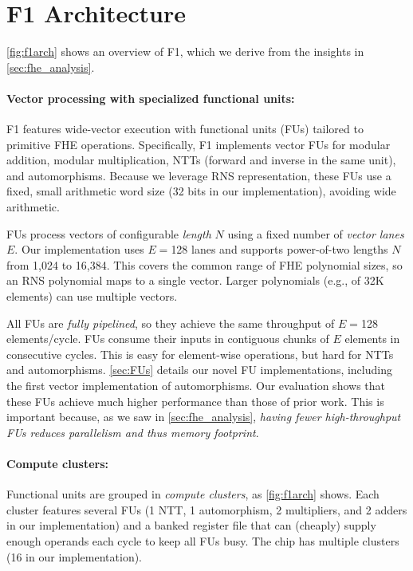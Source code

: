 \section{F1 Architecture}\label{sec:arch}

\autoref{fig:f1arch} shows an overview of F1, which we derive from the insights in \autoref{sec:fhe_analysis}.

\paragraph{Vector processing with specialized functional units:}
F1 features wide-vector execution with functional units (FUs) tailored to 
primitive FHE operations.
Specifically, F1 implements vector FUs for modular addition, modular multiplication, NTTs (forward and inverse in the same unit),
and automorphisms.
Because we leverage RNS representation, these FUs use a fixed, small arithmetic word size (32 bits in our implementation),
avoiding wide arithmetic.

FUs process vectors of configurable \emph{length} $N$ using a fixed number of \emph{vector lanes} $E$.
Our implementation uses $E=$128 lanes and supports power-of-two lengths $N$ from 1,024 to 16,384.
This covers the common range of FHE polynomial sizes, so an RNS polynomial maps to a single vector.
Larger polynomials (e.g., of 32K elements) can use multiple vectors.

All FUs are \emph{fully pipelined}, so they achieve the same throughput of $E=$128 elements/cycle.
FUs consume their inputs in contiguous chunks of $E$ elements in consecutive cycles.
This is easy for element-wise operations, but hard for NTTs and automorphisms.
\autoref{sec:FUs} details our novel FU implementations, including the first vector implementation of automorphisms.
Our evaluation shows that these FUs achieve much higher performance than those of prior work.
This is important because, as we saw in \autoref{sec:fhe_analysis},
\emph{having fewer high-throughput FUs reduces parallelism and thus memory footprint}.

\paragraph{Compute clusters:}
Functional units are grouped in \emph{compute clusters}, as \autoref{fig:f1arch} shows.
Each cluster features several FUs (1 NTT, 1 automorphism, 2 multipliers, and 2 adders in our implementation)
and a banked register file that can (cheaply) supply enough operands each cycle to keep all FUs busy.
The chip has multiple clusters (16 in our implementation).

